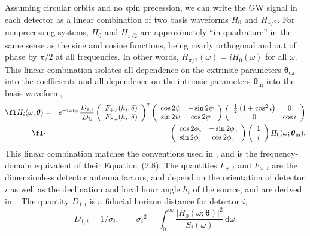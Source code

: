 \documentclass{iopart}
\begin{document}
Assuming circular orbits and no spin precession, we can write the \ac{GW} signal in each detector as a linear combination of two basis waveforms $H_0$ and $H_{\pi/2}$. For nonprecessing systems, $H_0$ and $H_{\pi/2}$ are approximately ``in quadrature'' in the same sense as the sine and cosine functions, being nearly orthogonal and out of phase by ${\pi/2}$ at all frequencies. In other words, $H_{\pi/2}(\omega) = i H_0(\omega)$ for all $\omega$. This linear combination isolates all dependence on the extrinsic parameters $\boldsymbol\theta_\mathrm{ex}$ into the coefficients and all dependence on the intrinsic parameters $\boldsymbol\theta_\mathrm{in}$ into the basis waveform,
%
\begin{eqnarray}\label{eq:full-signal-model}
	\fl H_i(\omega; \boldsymbol\theta) &=& e^{-i\omega t_\oplus}\frac{D_{1,i}}{D_\mathrm{L}}
	\left(\begin{array}{cc}
		F_{+,i}(h_i, \delta) \\
		F_{\times,i}(h_i, \delta)
	\end{array}\right)^\intercal
	\left(\begin{array}{cc}
		\cos{2\psi} & -\sin{2\psi} \\
		\sin{2\psi} & \cos{2\psi}
	\end{array}\right)
	\left(\begin{array}{cc}
		\frac{1}{2}\left(1+\cos^2{\iota}\right) & 0 \\
		0 & \cos{\iota}
	\end{array}\right) \nonumber\\\fl &\cdot&
	\left(\begin{array}{cc}
		\cos{2\phi_c} & -\sin{2\phi_c} \\
		\sin{2\phi_c} & \cos{2\phi_c}
	\end{array}\right)
	\left(\begin{array}{cc}
		1 \\
		i
	\end{array}\right) H_0(\omega; \boldsymbol\theta_\mathrm{in}).
\end{eqnarray}
%
This linear combination matches the conventions used in \cite{PhysRevD.83.084002}, and is the frequency-domain equivalent of their Equation~(2.8). The quantities $F_{+,i}$ and $F_{\times,i}$ are the dimensionless detector antenna factors, and depend on the orientation of detector $i$ as well as the declination and local hour angle $h_i$ of the source, and are derived in~\cite{PhysRevD.63.042003}. The quantity $D_{1,i}$ is a fiducial horizon distance for detector $i$,
%
\begin{equation}\label{eq:horizon}
D_{1,i} = 1 / \sigma_i, \qquad {\sigma_i}^2 = \int_0^\infty \frac{\left|H_0(\omega; \mathbf \theta)\right|^2}{S_i(\omega)} \,\mathrm{d}\omega.
\end{equation}
\end{document}
